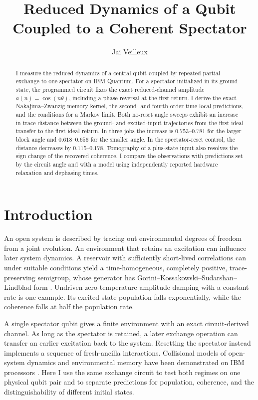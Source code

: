 \documentclass[
    pra,
    showpacs,
    groupedaddress,
    notitlepage,
    floatfix,
    nofootinbib
]{revtex4-2}
\begin{document}
\title{Reduced Dynamics of a Qubit Coupled to a Coherent Spectator}
\author{Jai Veilleux}

\begin{abstract}
I measure the reduced dynamics of a central qubit coupled by repeated partial exchange to one spectator on IBM Quantum. 
For a spectator initialized in its ground state, the programmed circuit fixes the exact reduced-channel amplitude 
$a(n)=\cos(n\theta)$, including a phase reversal at the first return. I derive the exact Nakajima--Zwanzig memory kernel, 
the second- and fourth-order time-local predictions, and the conditions for a Markov limit. Both no-reset angle sweeps exhibit 
an increase in trace distance between the ground- and excited-input trajectories from the first ideal transfer to the first ideal 
return. In three jobs the increase is $0.753$--$0.781$ for the larger block angle and $0.618$--$0.656$ for the smaller angle. 
In the spectator-reset control, the distance decreases by $0.115$--$0.178$. Tomography of a plus-state input also resolves the 
sign change of the recovered coherence. I compare the observations with predictions set by the circuit angle and with a model 
using independently reported hardware relaxation and dephasing times. 
\end{abstract}
\maketitle

\section{Introduction}
An open system is described by tracing out environmental degrees of freedom from a joint evolution. 
An environment that retains an excitation can influence later system dynamics. A reservoir with sufficiently 
short-lived correlations can under suitable conditions yield a time-homogeneous, completely positive, trace-preserving semigroup, 
whose generator has Gorini--Kossakowski--Sudarshan--Lindblad form \cite{breuer,lidar,gorini,lindblad}. Undriven zero-temperature 
amplitude damping with a constant rate is one example. Its excited-state population falls exponentially, while the coherence falls 
at half the population rate.

A single spectator qubit gives a finite environment with an exact circuit-derived channel. As long as the spectator is retained, 
a later exchange operation can transfer an earlier excitation back to the system. Resetting the spectator instead implements a 
sequence of fresh-ancilla interactions. Collisional models of open-system dynamics and environmental memory have been demonstrated 
on IBM processors \cite{garcia}. Here I use the same exchange circuit to test both regimes on one physical qubit pair and to 
separate predictions for population, coherence, and the distinguishability of different initial states.
\end{document}

